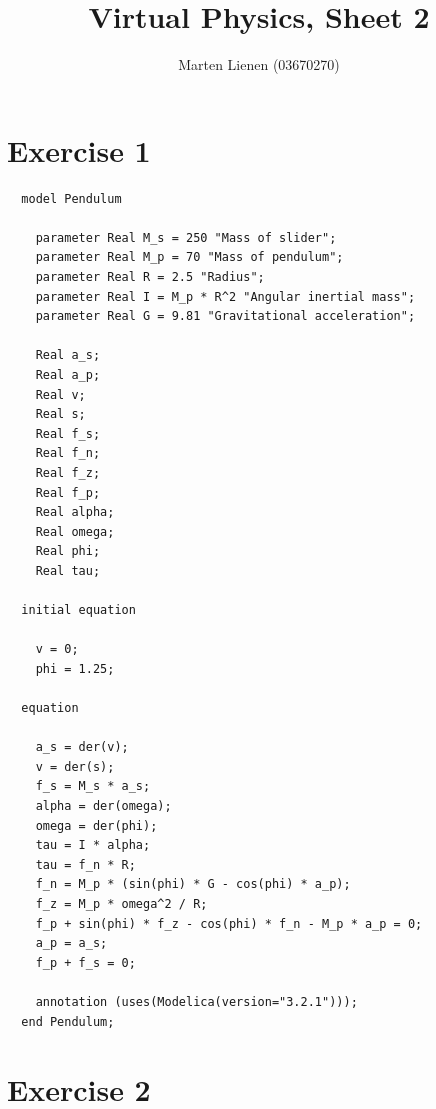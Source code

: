 \documentclass[10pt,a4paper]{article}
\title{Virtual Physics, Sheet 2}
\author{Marten Lienen (03670270)}
\begin{document}
\maketitle

\section*{Exercise 1}

\begin{verbatim}
  model Pendulum

    parameter Real M_s = 250 "Mass of slider";
    parameter Real M_p = 70 "Mass of pendulum";
    parameter Real R = 2.5 "Radius";
    parameter Real I = M_p * R^2 "Angular inertial mass";
    parameter Real G = 9.81 "Gravitational acceleration";

    Real a_s;
    Real a_p;
    Real v;
    Real s;
    Real f_s;
    Real f_n;
    Real f_z;
    Real f_p;
    Real alpha;
    Real omega;
    Real phi;
    Real tau;

  initial equation

    v = 0;
    phi = 1.25;

  equation

    a_s = der(v);
    v = der(s);
    f_s = M_s * a_s;
    alpha = der(omega);
    omega = der(phi);
    tau = I * alpha;
    tau = f_n * R;
    f_n = M_p * (sin(phi) * G - cos(phi) * a_p);
    f_z = M_p * omega^2 / R;
    f_p + sin(phi) * f_z - cos(phi) * f_n - M_p * a_p = 0;
    a_p = a_s;
    f_p + f_s = 0;

    annotation (uses(Modelica(version="3.2.1")));
  end Pendulum;
\end{verbatim}

\section*{Exercise 2}
\end{document}
